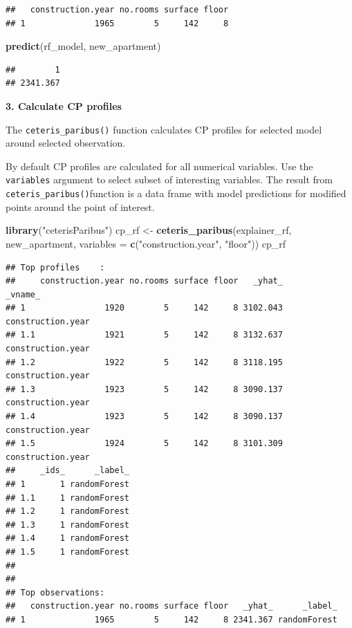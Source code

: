 \documentclass[]{krantz}
\newenvironment{Shaded}{\begin{snugshade}}{\end{snugshade}}
\newcommand{\DataTypeTok}[1]{\textcolor[rgb]{0.13,0.29,0.53}{#1}}
\newcommand{\KeywordTok}[1]{\textcolor[rgb]{0.13,0.29,0.53}{\textbf{#1}}}
\newcommand{\NormalTok}[1]{#1}
\newcommand{\StringTok}[1]{\textcolor[rgb]{0.31,0.60,0.02}{#1}}
\theoremstyle{definition}
\theoremstyle{definition}
\theoremstyle{definition}
\theoremstyle{remark}
\begin{document}
\begin{verbatim}
##   construction.year no.rooms surface floor
## 1              1965        5     142     8
\end{verbatim}

\begin{Shaded}
\begin{Highlighting}[]
\KeywordTok{predict}\NormalTok{(rf_model, new_apartment)}
\end{Highlighting}
\end{Shaded}

\begin{verbatim}
##        1 
## 2341.367
\end{verbatim}

\textbf{3. Calculate CP profiles}

The \texttt{ceteris\_paribus()} function calculates CP profiles for
selected model around selected observation.

By default CP profiles are calculated for all numerical variables. Use
the \texttt{variables} argument to select subset of interesting
variables. The result from \texttt{ceteris\_paribus()}function is a data
frame with model predictions for modified points around the point of
interest.

\begin{Shaded}
\begin{Highlighting}[]
\KeywordTok{library}\NormalTok{(}\StringTok{"ceterisParibus"}\NormalTok{)}
\NormalTok{cp_rf <-}\StringTok{ }\KeywordTok{ceteris_paribus}\NormalTok{(explainer_rf, new_apartment, }
                            \DataTypeTok{variables =} \KeywordTok{c}\NormalTok{(}\StringTok{"construction.year"}\NormalTok{, }\StringTok{"floor"}\NormalTok{))}
\NormalTok{cp_rf}
\end{Highlighting}
\end{Shaded}

\begin{verbatim}
## Top profiles    : 
##     construction.year no.rooms surface floor   _yhat_           _vname_
## 1                1920        5     142     8 3102.043 construction.year
## 1.1              1921        5     142     8 3132.637 construction.year
## 1.2              1922        5     142     8 3118.195 construction.year
## 1.3              1923        5     142     8 3090.137 construction.year
## 1.4              1923        5     142     8 3090.137 construction.year
## 1.5              1924        5     142     8 3101.309 construction.year
##     _ids_      _label_
## 1       1 randomForest
## 1.1     1 randomForest
## 1.2     1 randomForest
## 1.3     1 randomForest
## 1.4     1 randomForest
## 1.5     1 randomForest
## 
## 
## Top observations:
##   construction.year no.rooms surface floor   _yhat_      _label_
## 1              1965        5     142     8 2341.367 randomForest
\end{verbatim}
\end{document}

